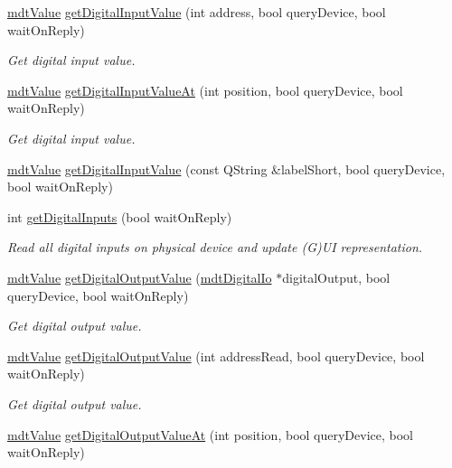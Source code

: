 \begin{DoxyCompactItemize}
\hyperlink{classmdt_value}{mdt\-Value} \hyperlink{classmdt_device_a9915b677a307ffeab98a413d61b0f2e7}{get\-Digital\-Input\-Value} (int address, bool query\-Device, bool wait\-On\-Reply)
\begin{DoxyCompactList}\small\item\em Get digital input value. \end{DoxyCompactList}\item 
\hyperlink{classmdt_value}{mdt\-Value} \hyperlink{classmdt_device_a8a17dbc767f75813241ce4a9709d0ac7}{get\-Digital\-Input\-Value\-At} (int position, bool query\-Device, bool wait\-On\-Reply)
\begin{DoxyCompactList}\small\item\em Get digital input value. \end{DoxyCompactList}\item 
\hyperlink{classmdt_value}{mdt\-Value} \hyperlink{classmdt_device_a295a2795695804cc291282d92a1c7641}{get\-Digital\-Input\-Value} (const Q\-String \&label\-Short, bool query\-Device, bool wait\-On\-Reply)
\item 
int \hyperlink{classmdt_device_a6e338b959c86591b6b3401f925c49050}{get\-Digital\-Inputs} (bool wait\-On\-Reply)
\begin{DoxyCompactList}\small\item\em Read all digital inputs on physical device and update (G)U\-I representation. \end{DoxyCompactList}\item 
\hyperlink{classmdt_value}{mdt\-Value} \hyperlink{classmdt_device_a978bde9f2b6177b6f3742163e7a712a9}{get\-Digital\-Output\-Value} (\hyperlink{classmdt_digital_io}{mdt\-Digital\-Io} $\ast$digital\-Output, bool query\-Device, bool wait\-On\-Reply)
\begin{DoxyCompactList}\small\item\em Get digital output value. \end{DoxyCompactList}\item 
\hyperlink{classmdt_value}{mdt\-Value} \hyperlink{classmdt_device_adf8160df55a9eb9ba6820e24bb7f1440}{get\-Digital\-Output\-Value} (int address\-Read, bool query\-Device, bool wait\-On\-Reply)
\begin{DoxyCompactList}\small\item\em Get digital output value. \end{DoxyCompactList}\item 
\hyperlink{classmdt_value}{mdt\-Value} \hyperlink{classmdt_device_abdd55e5a7bbfe268fc3c790e81da373a}{get\-Digital\-Output\-Value\-At} (int position, bool query\-Device, bool wait\-On\-Reply)

\end{DoxyCompactItemize}
